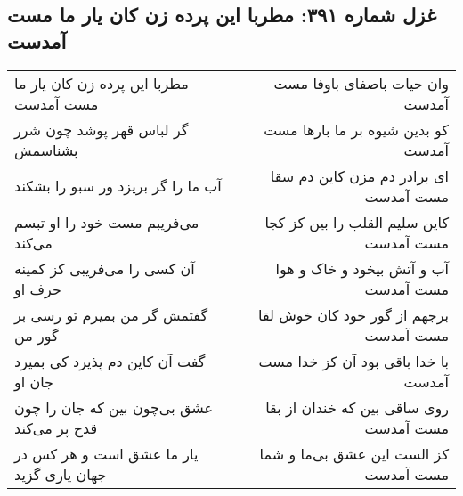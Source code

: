 \begin{center}
\section*{غزل شماره ۳۹۱: مطربا این پرده زن کان یار ما مست آمدست}
\label{sec:0391}
\begin{longtable}{l p{0.5cm} r}
مطربا این پرده زن کان یار ما مست آمدست
&&
وان حیات باصفای باوفا مست آمدست
\\
گر لباس قهر پوشد چون شرر بشناسمش
&&
کو بدین شیوه بر ما بارها مست آمدست
\\
آب ما را گر بریزد ور سبو را بشکند
&&
ای برادر دم مزن کاین دم سقا مست آمدست
\\
می‌فریبم مست خود را او تبسم می‌کند
&&
کاین سلیم القلب را بین کز کجا مست آمدست
\\
آن کسی را می‌فریبی کز کمینه حرف او
&&
آب و آتش بیخود و خاک و هوا مست آمدست
\\
گفتمش گر من بمیرم تو رسی بر گور من
&&
برجهم از گور خود کان خوش لقا مست آمدست
\\
گفت آن کاین دم پذیرد کی بمیرد جان او
&&
با خدا باقی بود آن کز خدا مست آمدست
\\
عشق بی‌چون بین که جان را چون قدح پر می‌کند
&&
روی ساقی بین که خندان از بقا مست آمدست
\\
یار ما عشق است و هر کس در جهان یاری گزید
&&
کز الست این عشق بی‌ما و شما مست آمدست
\\
\end{longtable}
\end{center}
